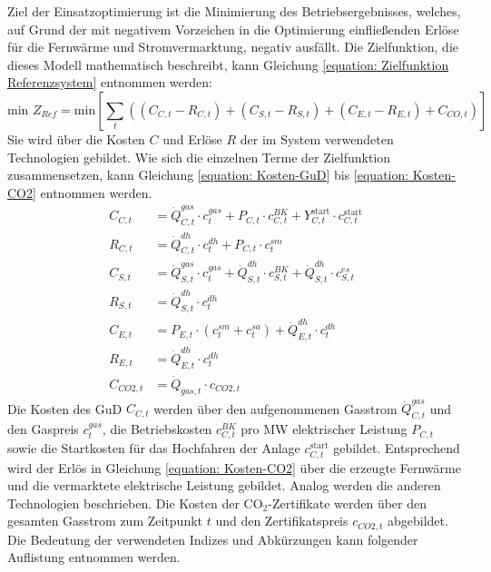 Ziel der Einsatzoptimierung ist die Minimierung des Betriebsergebnisses, welches, auf Grund der mit negativem Vorzeichen in die Optimierung einfließenden Erlöse für die Fernwärme und Stromvermarktung, negativ ausfällt. Die Zielfunktion, die dieses Modell mathematisch beschreibt, kann Gleichung \ref{equation: Zielfunktion Referenzsystem} entnommen werden:
	\begin{equation}
		\label{equation: Zielfunktion Referenzsystem}
		\text{min }  Z_{Ref} = \text{min} \left[ \sum_{t}^{} \left( (C_{C,t} - R_{C,t}) + (C_{S,t} - R_{S,t}) + (C_{E,t} - R_{E,t}) + C_{CO,t} \right) \right]
	\end{equation}
Sie wird über die Kosten $C$ und Erlöse $R$ der im System verwendeten Technologien gebildet. Wie sich die einzelnen Terme der Zielfunktion zusammensetzen, kann Gleichung \ref{equation: Kosten-GuD} bis \ref{equation: Kosten-CO2} entnommen werden.
	\begin{align}
		\label{equation: Kosten-GuD}
		C_{C,t} &= \dot{Q}_{C,t}^{gas} \cdot  c_{t}^{gas} + P_{C,t} \cdot c_{C,t}^{BK} + Y_{C,t}^{\text{start}} \cdot c_{C,t}^{\text{start}} \\
		R_{C,t} &= \dot{Q}_{C,t}^{dh} \cdot c_t^{dh} + P_{C,t} \cdot c_t^{sm} \\
		C_{S,t} &= \dot{Q}_{S,t}^{gas} \cdot c_{t}^{gas} + \dot{Q}_{S,t}^{dh} \cdot c_{S,t}^{BK} + \dot{Q}_{S,t}^{dh} \cdot c_{S,t}^{es} \\
		R_{S,t} &= \dot{Q}_{S,t}^{dh} \cdot  c_t^{dh} \\
		C_{E,t} &= P_{E,t} \cdot  (c_{t}^{sm} + c_{t}^{sa}) + \dot{Q}_{E,t}^{dh} \cdot c_t^{dh} \\
		R_{E,t} &= \dot{Q}_{E,t}^{dh} \cdot  c_t^{dh} \\
		\label{equation: Kosten-CO2}
		C_{CO2,t} &= \dot{Q}_{gas,t} \cdot  c_{CO2,t}
	\end{align}
Die Kosten des \ac{GuD} $C_{C,t}$ werden über den aufgenommenen Gasstrom $\dot{Q}_{C,t}^{gas}$ und den Gaspreis $c_{t}^{gas}$, die Betriebskosten $c_{C,t}^{BK}$ pro MW elektrischer Leistung $P_{C,t}$ sowie die Startkosten für das Hochfahren der Anlage $c_{C,t}^{\text{start}}$ gebildet. Entsprechend wird der Erlös in Gleichung \ref{equation: Kosten-CO2} über die erzeugte Fernwärme und die vermarktete elektrische Leistung gebildet. Analog werden die anderen Technologien beschrieben. Die Kosten der CO$_2$-Zertifikate werden über den gesamten Gasstrom zum Zeitpunkt $t$ und den Zertifikatspreis $c_{CO2,t}$ abgebildet.
Die Bedeutung der verwendeten Indizes und Abkürzungen kann folgender Auflistung entnommen werden.

